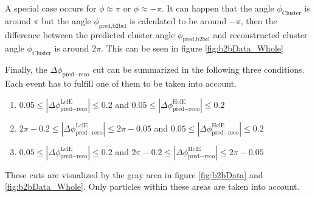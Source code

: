 \documentclass[a4paper,11pt,twosided,final,german,openbib,pdftex,listof=totoc,bibliography=totoc]{scrbook}
\begin{document}
A special case occurs for $\phi \approx \pi$ or $\phi \approx -\pi$. It can happen that the angle $\phi_{\textrm{Cluster}}$ is around $\pi$ but the angle $\phi_{\textrm{pred,b2bcl}}$ is calculated to be around $-\pi$, then the difference between the predicted cluster angle  $\phi_{\textrm{pred,b2bcl}}$ and reconstructed cluster angle $\phi_{\textrm{Cluster}}$ is around $2\pi$. This can be seen in figure \ref{fig:b2bData_Whole}

Finally, the $\Delta \phi _{\textrm{pred} - \textrm{reco}}$ cut can be summarized in the following three conditions. Each event has to fulfill one of them to be taken into account.

\begin{enumerate}[label=(\alph*)]
	\item $0.05 \leq |\Delta \phi _{\textrm{pred} - \textrm{reco}}^{\textrm{LclE}}| \leq 0.2$ and $ 0.05 \leq |\Delta \phi _{\textrm{pred} - \textrm{reco}}^{\textrm{HclE}}| \leq 0.2$
	
	\item $2\pi - 0.2 \leq |\Delta \phi _{\textrm{pred} - \textrm{reco}}^{\textrm{LclE}}|\leq 2\pi - 0.05$ and $ 0.05 \leq |\Delta \phi _{\textrm{pred} - \textrm{reco}}^{\textrm{HclE}}| \leq 0.2$
	
	\item $0.05 \leq|\Delta \phi _{\textrm{pred} - \textrm{reco}}^{\textrm{LclE}}| \leq 0.2 $ and $2\pi - 0.2 \leq |\Delta \phi _{\textrm{pred} - \textrm{reco}}^{\textrm{HclE}}| \leq 2\pi - 0.05$
\end{enumerate}

These cuts are visualized by the gray area in figure \ref{fig:b2bData} and \ref{fig:b2bData_Whole}. Only particles within these areas are taken into account.
\end{document}
